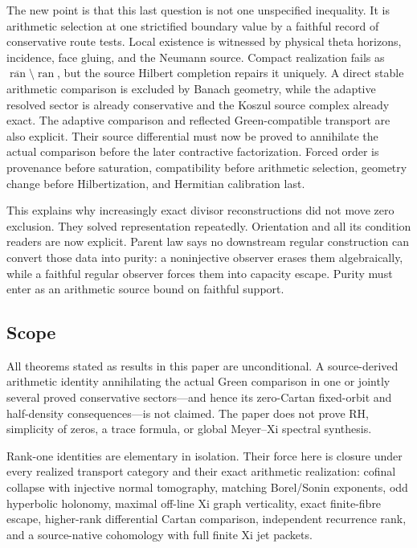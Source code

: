 \documentclass[11pt]{article}
\theoremstyle{definition}
\theoremstyle{remark}
\begin{document}
The new point is that this last question is not one unspecified inequality.
It is arithmetic selection at one strictified boundary value by a faithful
record of conservative route tests.  Local
existence is witnessed by physical theta horizons, incidence, face gluing,
and the Neumann source.  Compact realization fails as
\(\overline{\operatorname{ran}}\setminus\operatorname{ran}\), but the
source Hilbert completion repairs it uniquely.  A direct stable arithmetic
comparison is excluded by Banach geometry, while the adaptive resolved
sector is already conservative and the Koszul source complex already exact.
The adaptive comparison and reflected Green-compatible transport are also
explicit.  Their source differential must now be proved to annihilate the
actual comparison before the later contractive factorization.  Forced order is
provenance before saturation, compatibility before arithmetic selection,
geometry change before Hilbertization, and Hermitian calibration last.

This explains why increasingly exact divisor reconstructions did not move
zero exclusion.  They solved representation repeatedly.  Orientation and
all its condition readers are now explicit.  Parent law says no downstream
regular construction can convert those data into purity: a noninjective
observer erases them algebraically, while a faithful regular observer forces
them into capacity escape.  Purity must enter as an arithmetic source bound
on faithful support.

\subsection{Scope}

All theorems stated as results in this paper are unconditional.  A
source-derived arithmetic identity annihilating the actual Green comparison
in one or jointly several proved conservative sectors---and hence its
zero-Cartan fixed-orbit and half-density consequences---is not claimed.  The
paper does not prove RH,
simplicity of zeros, a trace formula, or global Meyer--Xi spectral synthesis.

Rank-one identities are elementary in isolation.  Their force here is
closure under every realized transport category and their exact arithmetic
realization: cofinal collapse with injective normal tomography, matching
Borel/Sonin exponents, odd hyperbolic holonomy, maximal off-line Xi graph
verticality, exact finite-fibre escape, higher-rank differential Cartan
comparison, independent recurrence rank, and a source-native cohomology
with full finite Xi jet packets.
\end{document}
